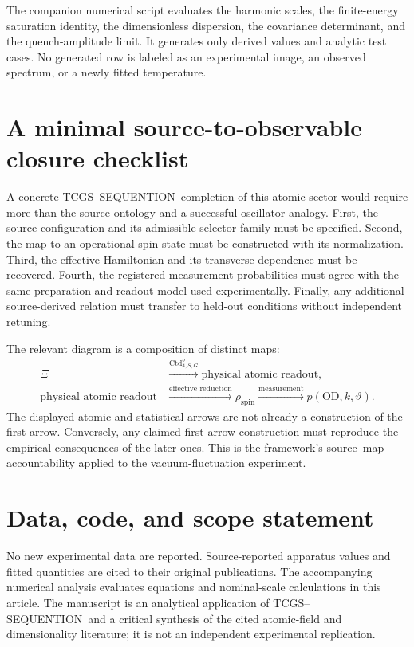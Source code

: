 \documentclass[11pt,a4paper]{article}
\theoremstyle{definition}
\theoremstyle{remark}
\newcommand{\TCGS}{TCGS--SEQUENTION}
\begin{document}
The companion numerical script evaluates the harmonic scales, the finite-energy saturation identity, the dimensionless dispersion, the covariance determinant, and the quench-amplitude limit. It generates only derived values and analytic test cases. No generated row is labeled as an experimental image, an observed spectrum, or a newly fitted temperature.

\section{A minimal source-to-observable closure checklist}
\label{app:closure}
A concrete \TCGS\ completion of this atomic sector would require more than the source ontology and a successful oscillator analogy. First, the source configuration and its admissible selector family must be specified. Second, the map to an operational spin state must be constructed with its normalization. Third, the effective Hamiltonian and its transverse dependence must be recovered. Fourth, the registered measurement probabilities must agree with the same preparation and readout model used experimentally. Finally, any additional source-derived relation must transfer to held-out conditions without independent retuning.\cite{foundation}

The relevant diagram is a composition of distinct maps:
\begin{equation}
 \begin{aligned}
 \Xi&\xrightarrow{\mathrm{Ctd}^{\sigma}_{4,S,G}}
 \text{physical atomic readout},\\
 \text{physical atomic readout}
 &\xrightarrow{\text{effective reduction}}\rho_{\mathrm{spin}}
 \xrightarrow{\text{measurement}}p(\mathrm{OD},k,\vartheta).
 \end{aligned}
 \label{eq:closure_chain}
\end{equation}
The displayed atomic and statistical arrows are not already a construction of the first arrow. Conversely, any claimed first-arrow construction must reproduce the empirical consequences of the later ones. This is the framework's source--map accountability applied to the vacuum-fluctuation experiment.\cite{foundation,planck}

\section*{Data, code, and scope statement}
No new experimental data are reported. Source-reported apparatus values and fitted quantities are cited to their original publications. The accompanying numerical analysis evaluates equations and nominal-scale calculations in this article. The manuscript is an analytical application of \TCGS\ and a critical synthesis of the cited atomic-field and dimensionality literature; it is not an independent experimental replication.
\end{document}
